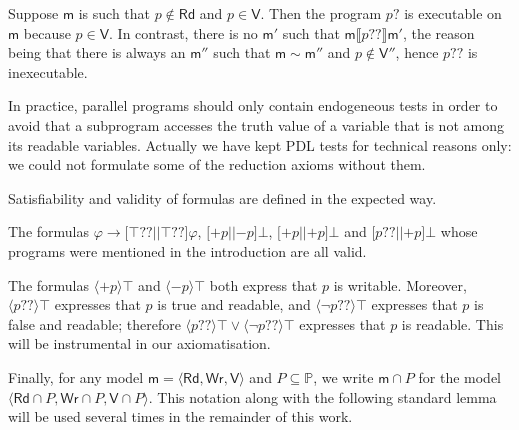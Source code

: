 \documentclass{llncs}
\newcommand{\modl}{\mathsf m}
\newcommand{\pll}{ {||} }							%
\newcommand{\readset}{\mathsf{Rd}}
\newcommand{\valuset}{\mathsf{V}}
\newcommand{\writeset}{\mathsf{Wr}}
\newcommand{\testendo}{?\!\!?}			%
\newcommand{\testpdl}{?}				%
\newcommand{\assgntopV}[1]{{\mathtt {+} #1}}
\newcommand{\assgnbotV}[1]{{\mathtt {-} #1}}
\newcommand{\intPgm}[1]{\llbracket #1 \rrbracket}
\newcommand{\lbox}[1]{ \big[ #1 \big] }
\newcommand{\ldia}[1]{ \big\langle #1 \big\rangle}
\newcommand{\limp}{ \rightarrow }
\newcommand{\ndet}{\,{\cup}\,}
\renewcommand{\phi}{\varphi}
\newcommand{\propset}{\mathbb P}
\newcommand{\modinter}{\cap}
\newcommand{\tuple}[1]{ \langle #1 \rangle}
\begin{document}
\begin{example}
Suppose $\modl$ is such that $p \notin \readset$ and $p \in \valuset$. 
Then the program $p \testpdl$ is executable on $\modl$ because $p \in \valuset$.
In contrast, there is no $\modl'$ such that $\modl \intPgm{ p \testendo } \modl'$, 
the reason being that there is always an $\modl''$ such that $\modl \sim \modl''$ and $p \notin \valuset''$,
hence $p \testendo$ is inexecutable. %
\end{example}

In practice, parallel programs should only contain endogeneous tests in order to avoid that a subprogram accesses the truth value of a variable that is not among its readable variables.
Actually we have kept PDL tests for technical reasons only:
we could not formulate some of the reduction axioms without them. 

Satisfiability and validity of formulas are defined in the expected way.

\begin{example}
The formulas 
$\phi \limp \lbox{ \top \testendo \pll \top \testendo } \phi$, 
$\lbox{ \assgntopV p \pll \assgnbotV p } \bot$,
$\lbox{ \assgntopV p \pll \assgntopV p } \bot$ and 
$\lbox{ p \testendo \pll \assgntopV p } \bot$ 
whose programs were mentioned in the introduction are all valid. 
\end{example}

The formulas $\ldia{ \assgntopV p } \top $ and $\ldia{ \assgnbotV p } \top $ both express that $p$ is writable. 
Moreover, $\ldia{ p \testendo} \top $ expresses that $p$ is true and readable, and 
$\ldia{ \lnot p \testendo} \top $ expresses that $p$ is false and readable;
therefore $\ldia{ p \testendo} \top \lor \ldia{ \lnot p \testendo} \top $ 
expresses that $p$ is readable. 
This will be instrumental in our axiomatisation. 

Finally, for any model $\modl = \tuple{\readset, \writeset, \valuset}$ and $P \subseteq \propset$, we write
$\modl \modinter P$ for the model $\tuple{\readset \cap P, \writeset \cap P, \valuset \cap P}$.
This notation along with the following standard lemma
will be used several times in the remainder of this work.
\end{document}
